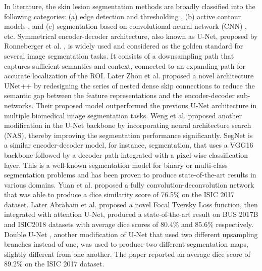 \documentclass[review]{elsarticle}
\begin{document}
In literature, the skin lesion segmentation methods are broadly classified into the following categories: (a) edge detection and thresholding \cite{ma2015novel}, (b) active contour models \cite{vasconcelos2019automatic}, and (c) segmentation based on convolutional neural network (CNN) \cite{wei2019attention, basak2020comparative}, etc. Symmetrical encoder-decoder architecture, also known as U-Net, proposed by Ronneberger et al. \cite{ronneberger2015u}, is widely used and considered as the golden standard for several image segmentation tasks. It consists of a downsampling path that captures sufficient semantics and context, connected to an expanding path for accurate localization of the ROI. Later Zhou et al. \cite{zhou2018unet++} proposed a novel architecture UNet++ by redesigning the series of nested dense skip connections to reduce the semantic gap between the feature representations and the encoder-decoder sub-networks. Their proposed model outperformed the previous U-Net architecture in multiple biomedical image segmentation tasks. Weng et al. \cite{weng2019unet} proposed another modification in the U-Net backbone by incorporating neural architecture search (NAS), thereby improving the segmentation performance significantly. SegNet \cite{badrinarayanan2017segnet} is a similar encoder-decoder model, for instance, segmentation, that uses a VGG16 backbone followed by a decoder path integrated with a pixel-wise classification layer. This is a well-known segmentation model for binary or multi-class segmentation problems and has been proven to produce state-of-the-art results in various domains. Yuan et al. \cite{yuan2017automatic} proposed a fully convolution-deconvolution network that was able to produce a dice similarity score of 76.5\% on the ISIC 2017 dataset. Later Abraham et al. \cite{abraham2019novel} proposed a novel Focal Tversky Loss function, then integrated with attention U-Net, produced a state-of-the-art result on BUS 2017B and ISIC2018 datasets with average dice scores of 80.4\% and 85.6\% respectively. Double U-Net \cite{jha2020doubleu}, another modification of U-Net that used two different upsampling branches instead of one, was used to produce two different segmentation maps, slightly different from one another. The paper reported an average dice score of 89.2\% on the ISIC 2017 dataset. 
 
\end{document}
